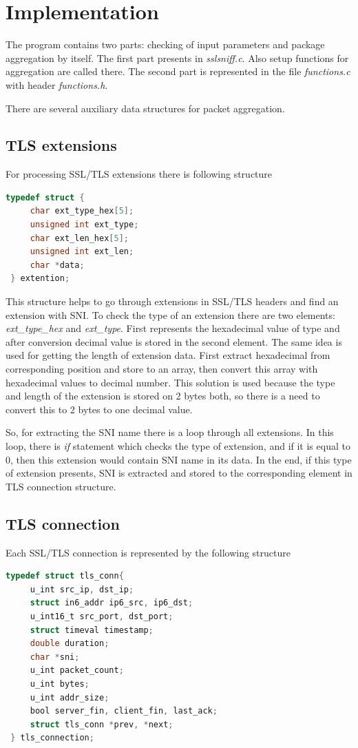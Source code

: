 \documentclass[12pt,a4paper]{article}
\begin{document}
    
    \section{Implementation}
    The program contains two parts: checking of input parameters and package 
    aggregation by itself. The first part presents in \textit{sslsniff.c}. Also 
    setup functions for aggregation are called there. The second part is represented 
    in the file \textit{functions.c} with header \textit{functions.h}. 

    There are several auxiliary data structures for packet aggregation. 

    \subsection{TLS extensions}
    For processing SSL/TLS extensions there is following structure
    \lstset{style=mystyle}
    \begin{lstlisting}[language=C]
 typedef struct {
     char ext_type_hex[5];
     unsigned int ext_type;
     char ext_len_hex[5];
     unsigned int ext_len;
     char *data;
 } extention;
    \end{lstlisting}
     
    This structure helps to go through extensions in SSL/TLS headers and find an 
    extension with SNI. To check the type of an extension there are two elements: 
    \textit{ext\_type\_hex} and \textit{ext\_type}. First represents the 
    hexadecimal value of type and after conversion decimal value is stored in 
    the second element. The same idea is used for getting the length of extension data. 
    First extract hexadecimal from corresponding position and store to an array, 
    then convert this array with hexadecimal values to decimal number. This 
    solution is used because the type and length of the extension is stored on 2 bytes 
    both, so there is a need to convert this to 2 bytes to one decimal value.

    So, for extracting the SNI name there is a loop through all extensions. In this
    loop, there is \textit{if} statement which checks the type of extension, and if it
    is equal to 0, then this extension would contain SNI name in its data. In the
    end, if this type of extension presents, SNI is extracted and stored to the
    corresponding element in TLS connection structure.
    
    \subsection{TLS connection}
    Each SSL/TLS connection is represented by the following structure
    \begin{lstlisting}[language=C]
 typedef struct tls_conn{
     u_int src_ip, dst_ip;
     struct in6_addr ip6_src, ip6_dst;
     u_int16_t src_port, dst_port;
     struct timeval timestamp;
     double duration;
     char *sni;
     u_int packet_count;
     u_int bytes;
     u_int addr_size;
     bool server_fin, client_fin, last_ack;
     struct tls_conn *prev, *next;
 } tls_connection;
    \end{lstlisting}
\end{document}
